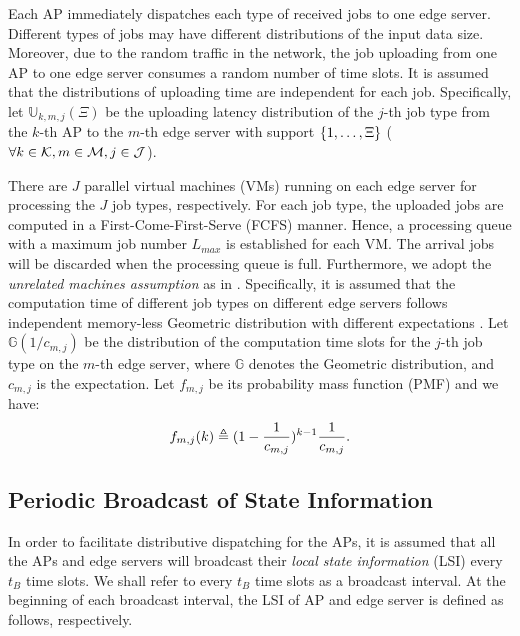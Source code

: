 Each AP immediately dispatches each type of received jobs to one edge server.
Different types of jobs may have different distributions of the input data size.
Moreover, due to the random traffic in the network, the job uploading from one AP to one edge server consumes a random number of time slots.
It is assumed that the distributions of uploading time are independent for each job.
Specifically, let $\mathbb{U}_{k,m,j}(\Xi)$ be the uploading latency distribution of the $j$-th job type from the $k$-th AP to the $m$-th edge server with support $\{1, \dots, \Xi\}$ ($\forall k\in\mathcal{K}, m\in\mathcal{M}, j\in\mathcal{J}$).

There are $J$ parallel virtual machines (VMs) running on each edge server for processing the $J$ job types, respectively.
For each job type, the uploaded jobs are computed in a First-Come-First-Serve (FCFS) manner.
Hence, a processing queue with a maximum job number $L_{max}$ is established for each VM.
The arrival jobs will be discarded when the processing queue is full.
Furthermore, we adopt the \emph{unrelated machines assumption} as in \cite{tan-online}.
Specifically, it is assumed that the computation time of different job types on different edge servers follows independent memory-less Geometric distribution with different expectations \cite{TOWC18-HuangKb}.
Let $\mathbb{G}(1/c_{m,j})$ be the distribution of the computation time slots for the $j$-th job type on the $m$-th edge server, where $\mathbb{G}$ denotes the Geometric distribution, and $c_{m,j}$ is the expectation.
Let $f_{m,j}$ be its probability mass function (PMF) and we have:
\begin{align}
    f_{m,j}(k) \triangleq (1-\frac{1}{c_{m,j}})^{k-1} \frac{1}{c_{m,j}}.
\end{align}

\subsection{Periodic Broadcast of State Information}
\label{subsec:broadcast}
In order to facilitate distributive dispatching for the APs, it is assumed that all the APs and edge servers will broadcast their \emph{local state information} (LSI) every $t_B$ time slots.
We shall refer to every $t_B$ time slots as a broadcast interval.
At the beginning of each broadcast interval, the LSI of AP and edge server is defined as follows, respectively.

